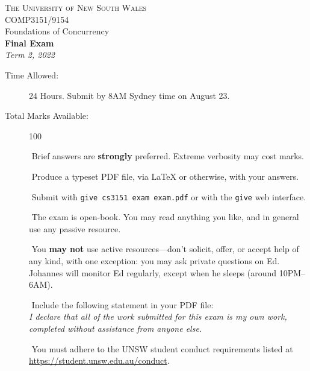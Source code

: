 \documentclass[a4paper,answers]{exam}
\begin{document}
\begin{flushright}
   $\ $\\[5em] %
\end{flushright}
\begin{center}
\textsc{\Large The University of New South Wales}\\[3em]
{\Huge COMP3151/9154\\[0.3em] Foundations of Concurrency}\\[3em]
{\Large \textbf{Final Exam}}\\[1em]
{\large \textit{Term 2, 2022}}\\[10em]
{\large
\begin{description}
    \item[Time Allowed:] 24 Hours. Submit by 8AM Sydney time on August 23.
    \item[Total Marks Available:] 100
    \item[] $\!\!\!\!\!$ Brief answers are \textbf{strongly} preferred. Extreme verbosity may cost marks.
    \item[] $\!\!\!\!\!$ Produce a typeset PDF file, via \LaTeX{} or otherwise, with your answers.
    \item[] $\!\!\!\!\!$ Submit with \texttt{give cs3151 exam exam.pdf} or with the \texttt{give} web interface.
    \item[] $\!\!\!\!\!$ The exam is open-book. You may read anything you like, and in general use any passive resource.
    \item[] $\!\!\!\!\!$ You \textbf{may not} use active resources---don't solicit, offer, or accept help of any kind, with one exception: you may ask private questions on Ed. Johannes will monitor Ed regularly, except when he sleeps (around 10PM--6AM).
    \item[] $\!\!\!\!\!$ Include the following statement in your PDF file:\\
\emph{I declare that all of the work submitted for this exam is my own work, completed without assistance from anyone else.}
   \item[] $\!\!\!\!\!$ You must adhere to the UNSW student conduct requirements listed at\\ \url{https://student.unsw.edu.au/conduct}.
\end{description}
}
\end{center}
\newpage
\end{document}
